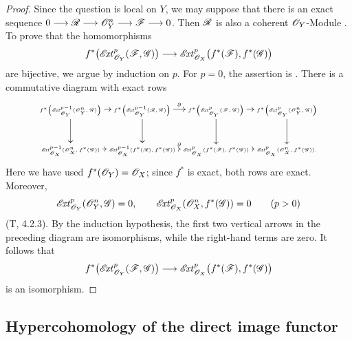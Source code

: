 \begin{proof}
Since the question is local on $Y$, we may suppose that there is an
exact sequence $0\longrightarrow\mathscr{R}\longrightarrow\mathscr{O}_Y^n
\longrightarrow\mathscr{F}\longrightarrow0$.
Then $\mathscr{R}$ is also a coherent $\mathscr{O}_Y$-Module
.
To prove that the homomorphisms
\[
  f^*\bigl(\mathscr{E}\!\mathit{xt}^p_{\mathscr{O}_Y}(\mathscr{F},\mathscr{G})\bigr)
  \longrightarrow
  \mathscr{E}\!\mathit{xt}^p_{\mathscr{O}_X}
    \bigl(f^*(\mathscr{F}),f^*(\mathscr{G})\bigr)
\]
are bijective, we argue by induction on $p$.
For $p=0$, the assertion is
.
There is a commutative diagram with exact rows
\[
{\tiny
  \xymatrix@C=2pt@R=24pt{
  f^*\!\left(\shExt^{p-1}_{\sh{O}_Y}(\sh{O}_Y^n,\sh{G})\right)
    \ar[r]\ar[d]
  & f^*\!\left(\shExt^{p-1}_{\sh{O}_Y}(\sh{R},\sh{G})\right)
    \ar[r]^\partial\ar[d]
  & f^*\!\left(\shExt^p_{\sh{O}_Y}(\sh{F},\sh{G})\right)
    \ar[r]\ar[d]
  & f^*\!\left(\shExt^p_{\sh{O}_Y}(\sh{O}_Y^n,\sh{G})\right)
    \ar[d]\\
  \shExt^{p-1}_{\sh{O}_X}(\sh{O}_X^n,f^*(\sh{G}))
    \ar[r]
  & \shExt^{p-1}_{\sh{O}_X}(f^*(\sh{R}),f^*(\sh{G}))
    \ar[r]^\partial
  & \shExt^p_{\sh{O}_X}(f^*(\sh{F}),f^*(\sh{G}))
    \ar[r]
  & \shExt^p_{\sh{O}_X}(\sh{O}_X^n,f^*(\sh{G})).
  }}
\]
Here we have used $f^*(\mathscr{O}_Y)=\mathscr{O}_X$; since $f^*$ is exact,
both rows are exact.
Moreover,
\[
  \mathscr{E}\!\mathit{xt}^p_{\mathscr{O}_Y}(\mathscr{O}_Y^n,\mathscr{G})=0,
  \qquad
  \mathscr{E}\!\mathit{xt}^p_{\mathscr{O}_X}(\mathscr{O}_X^n,f^*(\mathscr{G}))=0
  \qquad(p>0)
\]
(T, 4.2.3).
By the induction hypothesis, the first two vertical arrows in the
preceding diagram are isomorphisms, while the right-hand terms are
zero.  It follows that
\[
  f^*\bigl(\mathscr{E}\!\mathit{xt}^p_{\mathscr{O}_Y}(\mathscr{F},\mathscr{G})\bigr)
  \longrightarrow
  \mathscr{E}\!\mathit{xt}^p_{\mathscr{O}_X}
    \bigl(f^*(\mathscr{F}),f^*(\mathscr{G})\bigr)
\]
is an isomorphism.
\end{proof}

\subsection{Hypercohomology of the direct image functor}
\label{subsection:0.12.4}

